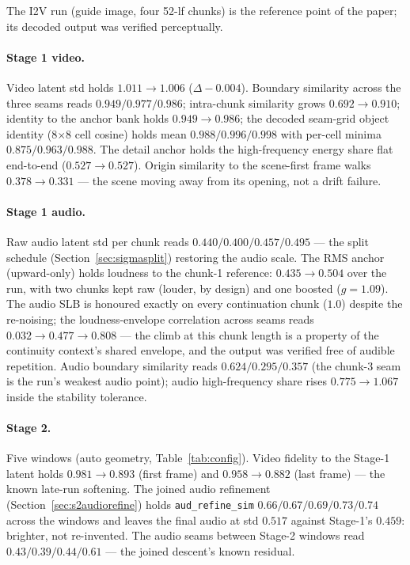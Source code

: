 \documentclass[12pt]{article}
\begin{document}
The I2V run (guide image, four 52-lf chunks) is the reference point of the
paper; its decoded output was verified perceptually.

\paragraph{Stage 1 video.}  Video latent std holds $1.011\to1.006$
($\Delta-0.004$).  Boundary similarity across the three seams reads
$0.949/0.977/0.986$; intra-chunk similarity grows $0.692\to0.910$; identity
to the anchor bank holds $0.949\to0.986$; the decoded seam-grid object
identity (8$\times$8 cell cosine) holds mean $0.988/0.996/0.998$ with
per-cell minima $0.875/0.963/0.988$.  The detail anchor holds the
high-frequency energy share flat end-to-end ($0.527\to0.527$).  Origin
similarity to the scene-first frame walks $0.378\to0.331$ --- the scene
moving away from its opening, not a drift failure.

\paragraph{Stage 1 audio.}  Raw audio latent std per chunk reads
$0.440/0.400/0.457/0.495$ --- the split schedule
(Section~\ref{sec:sigmasplit}) restoring the audio scale.  The RMS anchor
(upward-only) holds loudness to the chunk-1 reference:
$0.435\to0.504$ over the run, with two chunks kept raw (louder, by design)
and one boosted ($g=1.09$).  The audio SLB is honoured exactly on every
continuation chunk ($1.0$) despite the re-noising; the loudness-envelope
correlation across seams reads $0.032\to0.477\to0.808$ --- the climb at this
chunk length is a property of the continuity context's shared envelope, and
the output was verified free of audible repetition.  Audio boundary
similarity reads $0.624/0.295/0.357$ (the chunk-3 seam is the run's weakest
audio point); audio high-frequency share rises $0.775\to1.067$ inside the
stability tolerance.

\paragraph{Stage 2.}  Five windows (auto geometry, Table~\ref{tab:config}).
Video fidelity to the Stage-1 latent holds $0.981\to0.893$ (first frame) and
$0.958\to0.882$ (last frame) --- the known late-run softening.  The joined
audio refinement (Section~\ref{sec:s2audiorefine}) holds
\texttt{aud\_refine\_sim} $0.66/0.67/0.69/0.73/0.74$ across the windows and
leaves the final audio at std $0.517$ against Stage-1's $0.459$: brighter,
not re-invented.  The audio seams between Stage-2 windows read
$0.43/0.39/0.44/0.61$ --- the joined descent's known residual.
\end{document}
